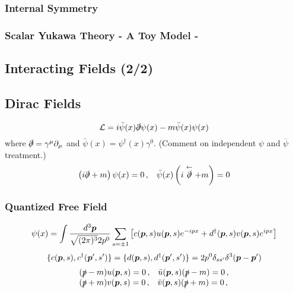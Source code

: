 \documentclass{jarticle}
\newcommand{\bld}[1]{\mbox{\boldmath $#1$}}
\newcommand{\myqftsrcdirectory}[0]{./}
\newcommand{\mainqftsrcdirectory}[0]{../../../src_qft}
\begin{document}
\subsubsection{Internal Symmetry}

\subsubsection{Scalar Yukawa Theory - A Toy Model -}


\subsection{Interacting Fields (2/2)}

\label{sec:InteractingFields2}

\newpage
\subsection{Dirac Fields}


\newpage 
\begin{equation}
{\cal L} = i \bar{\psi}(x) \slashed{\partial} \psi(x) - m \bar{\psi}(x) \psi(x)
\end{equation}
where $\slashed{\partial} = \gamma^\mu \partial_\mu$ and
$\bar{\psi}(x) = \psi^\dagger (x) \gamma^0$.
(Comment on independent $\psi$ and $\overline{\psi}$ treatment.)
\begin{equation}
\left(i \slashed{\partial} + m \right) \psi(x) = 0\,,
\hspace{3mm}
\bar{\psi}(x) \left(i \stackrel{\leftarrow}{\slashed{\partial}} + m \right)  = 0
\end{equation}
\subsubsection{Quantized Free Field}
\begin{equation}
\psi(x) 
=
\int \frac{d^3 \bld{p}}{\sqrt{(2\pi)^3} 2 p^0}
\sum_{s = \pm 1}
\left[
c(\bld{p}, s) u(\bld{p}, s) e^{-ipx}
+
d^\dagger(\bld{p}, s) v(\bld{p}, s) e^{ipx}
\right]
\end{equation}
\begin{equation}
\{ c(\bld{p}, s), c^\dagger(\bld{p}', s') \}
=
\{ d(\bld{p}, s), d^\dagger(\bld{p}', s') \}
=
2p^0 \delta_{ss'}
\delta^3(\bld{p} - \bld{p}')
\end{equation}
\begin{equation}
\begin{array}{l}
(\slashed{p} - m) u(\bld{p}, s) = 0\,,
\hspace{3mm}
\bar{u}(\bld{p}, s)(\slashed{p} - m)  = 0\,,
\\
(\slashed{p} + m) v(\bld{p}, s) = 0\,,
\hspace{3mm}
\bar{v}(\bld{p}, s)(\slashed{p} + m)  = 0\,,
\end{array}
\end{equation}
\end{document}
